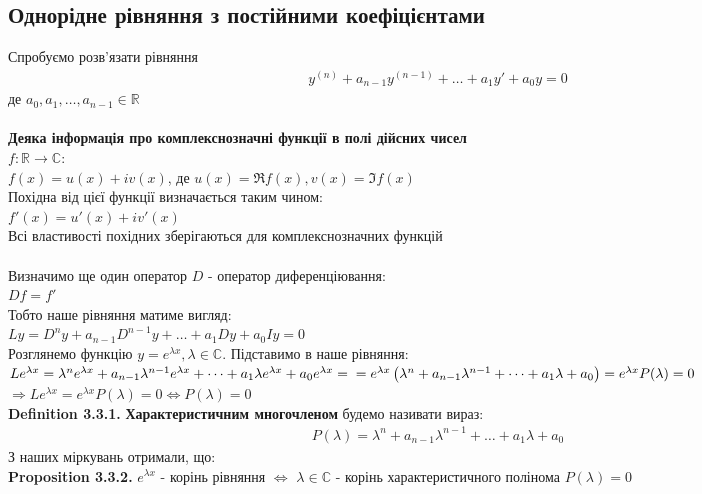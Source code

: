 \documentclass[a4paper, 14pt]{extarticle}
\def\huge{\displaystyle}
\def\defin#1{\textbf{Definition {#1}}}
\def\prp#1{\textbf{Proposition {#1}}}
\begin{document}
\subsection{Однорідне рівняння з постійними коефіцієнтами}
Спробуємо розв'язати рівняння
\begin{align*}
y^{(n)} + a_{n-1}y^{(n-1)}+\dots+a_1y'+a_0y = 0
\end{align*}
де $a_0, a_1,\dots,a_{n-1} \in \mathbb{R}$\\
\\ 
\textbf{Деяка інформація про комплекснозначні функції в полі дійсних чисел}\\
$f: \mathbb{R} \rightarrow \mathbb{C}:$\\
$f(x) = u(x) + iv(x)$, де $u(x) = \Re f(x), v(x) = \Im f(x)$\\
Похідна від цієї функції визначається таким чином:\\
$f'(x) = u'(x) + iv'(x)$\\
Всі властивості похідних зберігаються для комплекснозначних функцій
\\
\\
Визначимо ще один оператор $D$ - оператор диференціювання:\\
$Df = f'$\\
Тобто наше рівняння матиме вигляд:\\
$Ly = D^n y + a_{n-1}D^{n-1} y + \dots + a_1Dy + a_0Iy = 0$\\
Розглянемо функцію $\huge y = e^{\lambda x}, \lambda \in \mathbb{C}$. Підставимо в наше рівняння:\\
$Le^{\lambda x} = \lambda^n e^{\lambda x} + a_{n-1} \lambda^{n-1} e^{\lambda x} + \dots + a_1 \lambda e^{\lambda x} + a_0 e^{\lambda x} = \\ = e^{\lambda x} \left( \lambda^n + a_{n-1} \lambda^{n-1} + \dots + a_1 \lambda + a_0 \right) = e^{\lambda x} P(\lambda) = 0$\\
$\Rightarrow Le^{\lambda x} = e^{\lambda x} P(\lambda) = 0 \iff P(\lambda) = 0$\\
\defin{3.3.1.} \textbf{Характеристичним многочленом} будемо називати вираз:
\begin{align*}
P(\lambda) = \lambda^n + a_{n-1} \lambda^{n-1} + \dots + a_1 \lambda + a_0
\end{align*}
З наших міркувань отримали, що:\\
\prp{3.3.2.} $\huge e^{\lambda x}$ - корінь рівняння $\iff$ $\lambda \in \mathbb{C}$ - корінь характеристичного полінома $P(\lambda) = 0$\\
\end{document}
